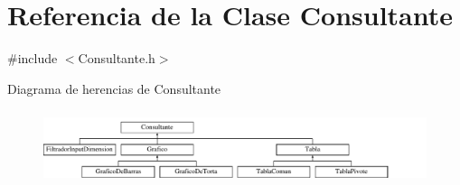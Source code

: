 \hypertarget{classConsultante}{\section{\-Referencia de la \-Clase \-Consultante}
\label{classConsultante}
}


{\ttfamily \#include $<$\-Consultante.\-h$>$}

\-Diagrama de herencias de \-Consultante\begin{figure}[H]
\begin{center}
\leavevmode
\includegraphics[height=2.196079cm]{classConsultante}
\end{center}
\end{figure}
